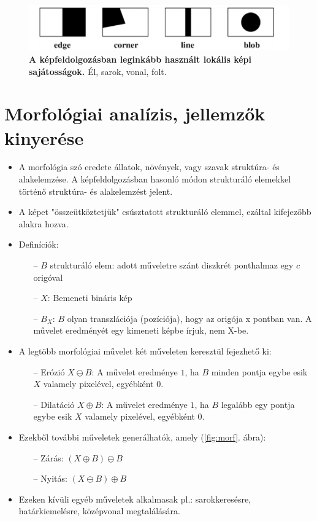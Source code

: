 \documentclass[12pt]{article}
\theoremstyle{plain}
\begin{document}
\begin{figure}[H]
    \begin{center}
    \includegraphics[width=0.75\linewidth]{media/edges.png}
    \caption{\textbf{A képfeldolgozásban leginkább használt lokális képi sajátosságok.} Él, sarok, vonal, folt.} 
    \label{fig:edges}
    \end{center}
\end{figure}

\section{Morfológiai analízis, jellemzők kinyerése}

\begin{itemize}
    \item A morfológia szó eredete állatok, növények, vagy szavak struktúra- és alakelemzése. A képfeldolgozásban hasonló módon strukturáló elemekkel történő struktúra- és alakelemzést jelent.
    \item A képet "összeütköztetjük" csúsztatott strukturáló elemmel, ezáltal kifejezőbb alakra hozva.
    \item Definíciók:
    \begin{itemize}
        \item[--] $B$ strukturáló elem: adott műveletre szánt diszkrét ponthalmaz egy $c$ origóval
        \item[--] $X$: Bemeneti bináris kép
        \item[--] $B_X$: $B$ olyan transzlációja (pozíciója), hogy az origója x pontban van. A művelet eredményét egy kimeneti képbe írjuk, nem X-be.
    \end{itemize}{}
    \item A legtöbb morfológiai művelet két műveleten keresztül fejezhető ki:
     \begin{itemize}
        \item[--] Erózió $X\ominus B$: A művelet eredménye $1$, ha $B$ minden pontja egybe esik $X$ valamely pixelével, egyébként 0.
        \item[--] Dilatáció $X\oplus B$: A művelet eredménye $1$, ha $B$ legalább egy pontja egybe esik $X$ valamely pixelével, egyébként 0.
    \end{itemize}{}
    \item Ezekből további műveletek generálhatók, amely (\ref{fig:morf}. ábra):
    \begin{itemize}
        \item[--] Zárás: $(X\oplus B) \ominus B$
        \item[--] Nyitás: $(X\ominus B) \oplus B$
    \end{itemize}{}   
    \item Ezeken kívüli egyéb műveletek alkalmasak pl.: sarokkeresésre, határkiemelésre, középvonal megtalálására.
\end{itemize}{}
\end{document}
